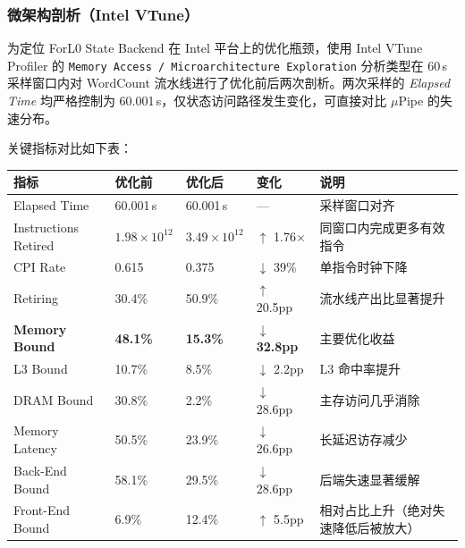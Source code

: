 \documentclass[a4paper,11pt]{article}
\newcommand{\project}{ForL0 State Backend}
\begin{document}
\subsubsection{微架构剖析（Intel VTune）}

为定位 \project{} 在 Intel 平台上的优化瓶颈，使用 Intel VTune Profiler 的 \texttt{Memory Access / Microarchitecture Exploration} 分析类型在 60\,s 采样窗口内对 WordCount 流水线进行了优化前后两次剖析。两次采样的 \emph{Elapsed Time} 均严格控制为 60.001\,s，仅状态访问路径发生变化，可直接对比 $\mu$Pipe 的失速分布。

关键指标对比如下表：

\begin{table}[H]
\centering
\small
\begin{tabularx}{\textwidth}{L{4.2cm} R{2.3cm} R{2.3cm} R{2.3cm} X}
\toprule
\textbf{指标} & \textbf{优化前} & \textbf{优化后} & \textbf{变化} & \textbf{说明} \\
\midrule
Elapsed Time            & 60.001\,s            & 60.001\,s            & ---            & 采样窗口对齐 \\
Instructions Retired    & $1.98 \times 10^{12}$ & $3.49 \times 10^{12}$ & $\uparrow$ 1.76$\times$ & 同窗口内完成更多有效指令 \\
CPI Rate                & 0.615                & 0.375                & $\downarrow$ 39\% & 单指令时钟下降 \\
Retiring                & 30.4\%               & 50.9\%               & $\uparrow$ 20.5pp & 流水线产出比显著提升 \\
\textbf{Memory Bound}   & \textbf{48.1\%}      & \textbf{15.3\%}      & $\downarrow$ \textbf{32.8pp} & 主要优化收益 \\
\quad L3 Bound          & 10.7\%               & 8.5\%                & $\downarrow$ 2.2pp  & L3 命中率提升 \\
\quad DRAM Bound        & 30.8\%               & 2.2\%                & $\downarrow$ 28.6pp & 主存访问几乎消除 \\
\quad\quad Memory Latency & 50.5\%             & 23.9\%               & $\downarrow$ 26.6pp & 长延迟访存减少 \\
Back-End Bound          & 58.1\%               & 29.5\%               & $\downarrow$ 28.6pp & 后端失速显著缓解 \\
Front-End Bound         & 6.9\%                & 12.4\%               & $\uparrow$ 5.5pp   & 相对占比上升（绝对失速降低后被放大） \\
\bottomrule
\end{tabularx}
\end{table}
\end{document}
